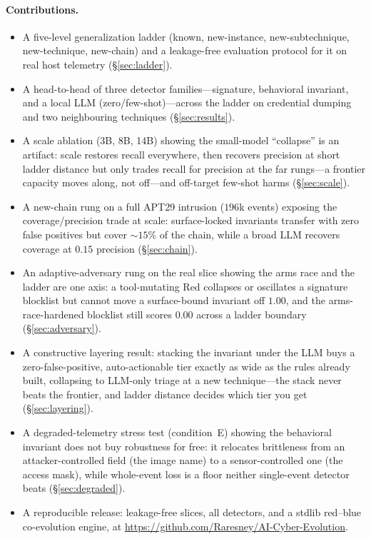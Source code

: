\documentclass[sigconf,nonacm]{acmart}
\begin{document}
\paragraph{Contributions.}
\begin{itemize}
  \item A five-level generalization ladder (known, new-instance,
  new-subtechnique, new-technique, new-chain) and a leakage-free evaluation
  protocol for it on real host telemetry (\S\ref{sec:ladder}).
  \item A head-to-head of three detector families---signature, behavioral
  invariant, and a local LLM (zero/few-shot)---across the ladder on credential
  dumping and two neighbouring techniques (\S\ref{sec:results}).
  \item A scale ablation (3B, 8B, 14B) showing the small-model ``collapse'' is an
  artifact: scale restores recall everywhere, then recovers precision at short
  ladder distance but only trades recall for precision at the far rungs---a
  frontier capacity moves along, not off---and off-target few-shot harms
  (\S\ref{sec:scale}).
  \item A new-chain rung on a full APT29 intrusion ($196$k events) exposing the
  coverage/precision trade at scale: surface-locked invariants transfer with
  zero false positives but cover $\sim\!15\%$ of the chain, while a broad LLM
  recovers coverage at $0.15$ precision (\S\ref{sec:chain}).
  \item An adaptive-adversary rung on the real slice showing the arms race and
  the ladder are one axis: a tool-mutating Red collapses or oscillates a
  signature blocklist but cannot move a surface-bound invariant off $1.00$, and
  the arms-race-hardened blocklist still scores $0.00$ across a ladder boundary
  (\S\ref{sec:adversary}).
  \item A constructive layering result: stacking the invariant under the LLM
  buys a zero-false-positive, auto-actionable tier exactly as wide as the rules
  already built, collapsing to LLM-only triage at a new technique---the stack
  never beats the frontier, and ladder distance decides which tier you get
  (\S\ref{sec:layering}).
  \item A degraded-telemetry stress test (condition~E) showing the behavioral
  invariant does not buy robustness for free: it relocates brittleness from an
  attacker-controlled field (the image name) to a sensor-controlled one (the
  access mask), while whole-event loss is a floor neither single-event detector
  beats (\S\ref{sec:degraded}).
  \item A reproducible release: leakage-free slices, all detectors, and a
  stdlib red--blue co-evolution engine, at
  \url{https://github.com/Raresney/AI-Cyber-Evolution}.
\end{itemize}
\end{document}
